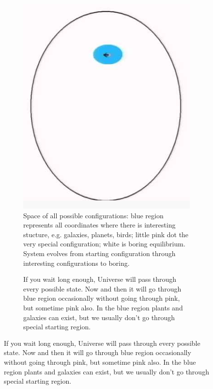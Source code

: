 \documentclass[]{article}
\begin{document}
\begin{figure}[H]
	\caption{Configuration Space}
	\begin{subfigure}[b]{0.3\textwidth}
		\caption{Space of all possible configurations: blue region represents all coordinates where there is interesting stucture, e.g. galaxies, planets, birds; little pink dot the very special configuration; white is boring equilibrium. System evolves from starting configuration through interesting configurations to boring.}
		\includegraphics[width=\textwidth]{time-config-space}
	\end{subfigure}
	\begin{subfigure}[b]{0.3\textwidth}
		\caption{If you wait long enough, Universe will pass through every possible state.  Now and then it will go through blue region occasionally without going through pink, but sometime pink also. In the blue region plants and galaxies can exist, but we usually don't go through special starting region.}\label{fig:time-univers-passes-through-every-possible-state}

\end{subfigure}
\end{figure}
\end{document}
